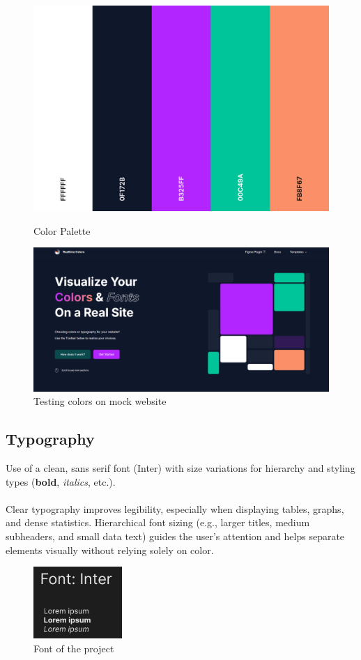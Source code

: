 \begin{figure}[ht]
    \centering
    \begin{minipage}[t]{0.48\textwidth}
        \centering
        \includegraphics[width=\textwidth]{images/Colors}
        \caption{Color Palette}
    \end{minipage}
    \hfill
    \begin{minipage}[t]{0.48\textwidth}
        \centering
        \includegraphics[width=\textwidth]{images/ColorsTested}
        \caption{Testing colors on mock website}
    \end{minipage}
\end{figure}

\subsection{Typography}

Use of a clean, sans serif font (Inter) with size variations for hierarchy and styling types (\textbf{bold}, \textit{italics}, etc.).
\\
\\
Clear typography improves legibility, especially when displaying tables, graphs, and dense statistics. Hierarchical font sizing (e.g., larger titles, medium subheaders, and small data text) guides the user's attention and helps separate elements visually without relying solely on color.

\begin{figure}[ht]
    \centering
    \includegraphics[width=0.3\textwidth]{images/Font}
    \caption{Font of the project}
\end{figure}
